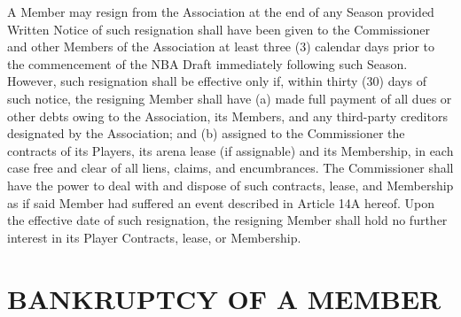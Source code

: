 \documentclass[]{book}
\theoremstyle{definition}
\theoremstyle{definition}
\theoremstyle{definition}
\theoremstyle{remark}
\begin{document}
A Member may resign from the Association at the end of any Season
provided Written Notice of such resignation shall have been given to the
Commissioner and other Members of the Association at least three (3)
calendar days prior to the commencement of the NBA Draft immediately
following such Season. However, such resignation shall be effective only
if, within thirty (30) days of such notice, the resigning Member shall
have (a) made full payment of all dues or other debts owing to the
Association, its Members, and any third-party creditors designated by
the Association; and (b) assigned to the Commissioner the contracts of
its Players, its arena lease (if assignable) and its Membership, in each
case free and clear of all liens, claims, and encumbrances. The
Commissioner shall have the power to deal with and dispose of such
contracts, lease, and Membership as if said Member had suffered an event
described in Article 14A hereof. Upon the effective date of such
resignation, the resigning Member shall hold no further interest in its
Player Contracts, lease, or Membership.

\section{BANKRUPTCY OF A MEMBER}\label{bankruptcy-of-a-member}
\end{document}
